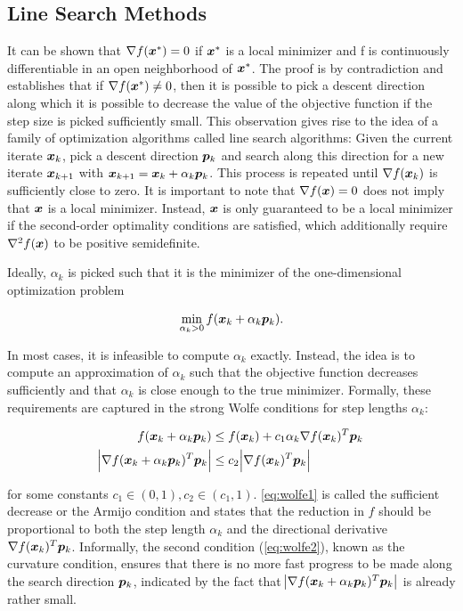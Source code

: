 \subsection{Line Search Methods}\label{ss:line-search}
It can be shown that $\nabla f(\bm{x}^*) = 0$ if $\bm{x}^*$ is a local minimizer and f is continuously differentiable in an open neighborhood
of $\bm{x}^*$. The proof is by contradiction and establishes that if $\nabla f(\bm{x}^*) \neq 0$, then it is possible to pick a descent 
direction along which it is possible to decrease the value of the objective function if the step size is picked sufficiently small. This 
observation gives rise to the idea of a family of optimization algorithms called line search algorithms: Given the current 
iterate $\bm{x}_k$, pick a descent direction $\bm{p}_k$ and search along this direction for a new iterate $\bm{x}_{k+1}$ with $\bm{x}_{k+1} = 
\bm{x}_k + \alpha_k \bm{p}_k$. This process is repeated until $\nabla f(\bm{x}_k)$ is sufficiently close to zero. It is important to note that 
$\nabla f(\bm{x}) = 0$ does not imply that $\bm{x}$ is a local minimizer. Instead, $\bm{x}$ is only guaranteed to be a local minimizer if 
the second-order 
optimality conditions are satisfied, which additionally require $\nabla^2 f(\bm{x})$ to be positive semidefinite.

Ideally, $\alpha_k$ is picked such that it is the minimizer of the one-dimensional optimization problem

\[
    \min_{\alpha_k > 0} f(\bm{x}_k + \alpha_k \bm{p}_k).
\]

\noindent In most cases, it is infeasible to compute $\alpha_k$ exactly. Instead, the idea is to compute an approximation of $\alpha_k$ such that 
the objective function decreases sufficiently and that $\alpha_k$ is close enough to the true minimizer. Formally, these requirements
are captured in the strong Wolfe conditions for step lengths $\alpha_k$:

\begin{align}
    f(\bm{x}_k + \alpha_k \bm{p}_k) &\leq f(\bm{x}_k) + c_1 \alpha_k \nabla f(\bm{x}_k)^T \bm{p}_k \label{eq:wolfe1} \\
    \abs{\nabla f(\bm{x}_k + \alpha_k \bm{p}_k)^T \bm{p}_k} &\leq c_2 \abs{\nabla f(\bm{x}_k)^T \bm{p}_k} \label{eq:wolfe2}
\end{align}

\noindent for some constants $c_1 \in (0, 1), c_2 \in (c_1, 1)$. \autoref{eq:wolfe1} is called the sufficient decrease or the Armijo condition 
and states that the reduction in $f$ should be proportional to both the step length $\alpha_k$ and the directional derivative 
$\nabla f(\bm{x}_k)^T \bm{p}_k$. Informally, the second condition (\cref{eq:wolfe2}), known as the curvature condition, ensures that there 
is no more fast 
progress to be made along the search direction $\bm{p}_k$, indicated by the fact that $\abs{\nabla f(\bm{x}_k + \alpha_k \bm{p}_k)^T
\bm{p}_k}$ is already rather small. 

